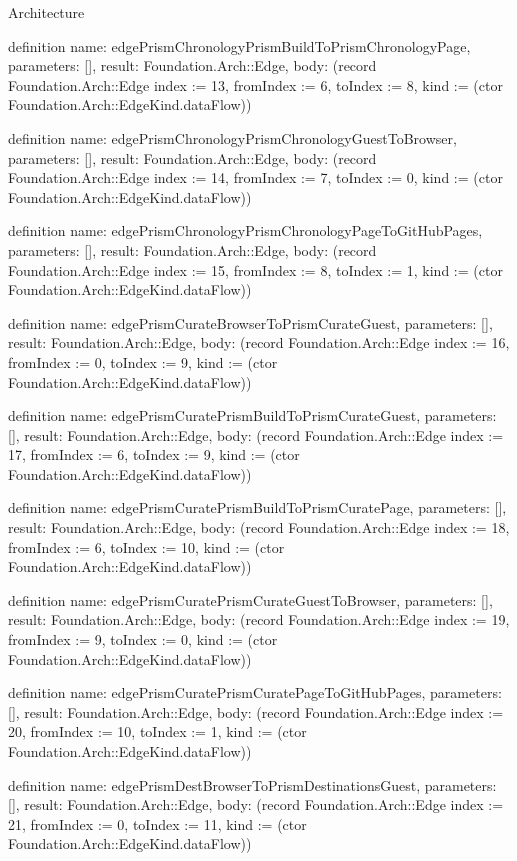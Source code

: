 \begin{lexlean}{Architecture}
\begin{semanticmodule}
definition{
  name: edgePrismChronologyPrismBuildToPrismChronologyPage,
  parameters: [],
  result: Foundation.Arch::Edge,
  body: (record Foundation.Arch::Edge {index := 13, fromIndex := 6, toIndex := 8, kind := (ctor Foundation.Arch::EdgeKind.dataFlow)})
}

definition{
  name: edgePrismChronologyPrismChronologyGuestToBrowser,
  parameters: [],
  result: Foundation.Arch::Edge,
  body: (record Foundation.Arch::Edge {index := 14, fromIndex := 7, toIndex := 0, kind := (ctor Foundation.Arch::EdgeKind.dataFlow)})
}

definition{
  name: edgePrismChronologyPrismChronologyPageToGitHubPages,
  parameters: [],
  result: Foundation.Arch::Edge,
  body: (record Foundation.Arch::Edge {index := 15, fromIndex := 8, toIndex := 1, kind := (ctor Foundation.Arch::EdgeKind.dataFlow)})
}

definition{
  name: edgePrismCurateBrowserToPrismCurateGuest,
  parameters: [],
  result: Foundation.Arch::Edge,
  body: (record Foundation.Arch::Edge {index := 16, fromIndex := 0, toIndex := 9, kind := (ctor Foundation.Arch::EdgeKind.dataFlow)})
}

definition{
  name: edgePrismCuratePrismBuildToPrismCurateGuest,
  parameters: [],
  result: Foundation.Arch::Edge,
  body: (record Foundation.Arch::Edge {index := 17, fromIndex := 6, toIndex := 9, kind := (ctor Foundation.Arch::EdgeKind.dataFlow)})
}

definition{
  name: edgePrismCuratePrismBuildToPrismCuratePage,
  parameters: [],
  result: Foundation.Arch::Edge,
  body: (record Foundation.Arch::Edge {index := 18, fromIndex := 6, toIndex := 10, kind := (ctor Foundation.Arch::EdgeKind.dataFlow)})
}

definition{
  name: edgePrismCuratePrismCurateGuestToBrowser,
  parameters: [],
  result: Foundation.Arch::Edge,
  body: (record Foundation.Arch::Edge {index := 19, fromIndex := 9, toIndex := 0, kind := (ctor Foundation.Arch::EdgeKind.dataFlow)})
}

definition{
  name: edgePrismCuratePrismCuratePageToGitHubPages,
  parameters: [],
  result: Foundation.Arch::Edge,
  body: (record Foundation.Arch::Edge {index := 20, fromIndex := 10, toIndex := 1, kind := (ctor Foundation.Arch::EdgeKind.dataFlow)})
}

definition{
  name: edgePrismDestBrowserToPrismDestinationsGuest,
  parameters: [],
  result: Foundation.Arch::Edge,
  body: (record Foundation.Arch::Edge {index := 21, fromIndex := 0, toIndex := 11, kind := (ctor Foundation.Arch::EdgeKind.dataFlow)})
}


\end{semanticmodule}
\end{lexlean}
